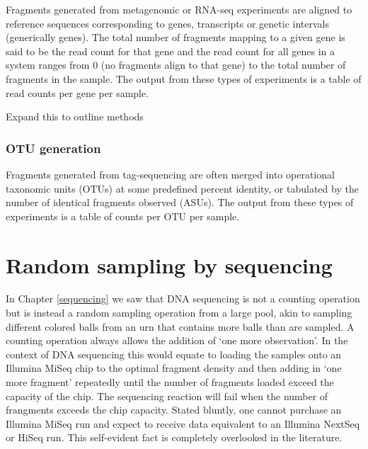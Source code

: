 \documentclass[onecolumn]{book}
\theoremstyle{definition}
\theoremstyle{definition}
\theoremstyle{definition}
\theoremstyle{remark}
\begin{document}
Fragments generated from metagenomic or RNA-seq experiments are aligned
to reference sequences corresponding to genes, transcripts or genetic
intervals (generically genes). The total number of fragments mapping to
a given gene is said to be the read count for that gene and the read
count for all genes in a system ranges from 0 (no fragments align to
that gene) to the total number of fragments in the sample. The output
from these types of experiments is a table of read counts per gene per
sample.

Expand this to outline methods

\hypertarget{otu-generation}{%
\subsection{OTU generation}\label{otu-generation}}

Fragments generated from tag-sequencing are often merged into
operational taxonomic units (OTUs) at some predefined percent identity,
or tabulated by the number of identical fragments observed (ASUs). The
output from these types of experiments is a table of counts per OTU per
sample.

\hypertarget{random}{%
\chapter{Random sampling by sequencing}\label{random}}

In Chapter \ref{sequencing} we saw that DNA sequencing is not a counting
operation but is instead a random sampling operation from a large pool,
akin to sampling different colored balls from an urn that contains more
balls than are sampled. A counting operation always allows the addition
of `one more observation'. In the context of DNA sequencing this would
equate to loading the samples onto an Illumina MiSeq chip to the optimal
fragment density and then adding in `one more fragment' repeatedly until
the number of fragments loaded exceed the capacity of the chip. The
sequencing reaction will fail when the number of frangments exceeds the
chip capacity. Stated bluntly, one cannot purchase an Illumina MiSeq run
and expect to receive data equivalent to an Illumina NextSeq or HiSeq
run. This self-evident fact is completely overlooked in the literature.
\end{document}
